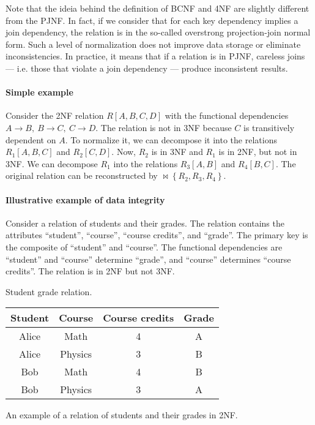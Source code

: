Note that the ideia behind the definition of BCNF and 4NF are slightly different from the
PJNF.  In fact, if we consider that for each key dependency implies a join dependency, the
relation is in the so-called overstrong projection-join normal
form.  Such a level of normalization does not improve data storage
or eliminate inconsistencies.  In practice, it means that if a relation is in PJNF,
careless joins --- i.e. those that violate a join dependency --- produce
inconsistent results.

\paragraph{Simple example}  Consider the 2NF relation $R[A, B, C, D]$ with the functional
dependencies $A \to B,~B \to C,~C \to D$.  The relation is not in 3NF because $C$ is
transitively dependent on $A$.  To normalize it, we can decompose it into the
relations $R_1[A, B, C]$ and $R_2[C, D]$.  Now, $R_2$ is in 3NF and $R_1$ is in 2NF, but
not in 3NF.  We can decompose $R_1$ into the relations $R_3[A, B]$ and $R_4[B, C]$.
The original relation can be reconstructed by $\bowtie \left\{ R_2, R_3, R_4 \right\}$.

\paragraph{Illustrative example of data integrity}  Consider a relation of students and
their grades.  The relation contains the attributes ``student'', ``course'', ``course
credits'', and ``grade''.  The primary key is the composite of ``student'' and ``course''.
The functional dependencies are ``student'' and ``course'' determine ``grade'', and
``course'' determines ``course credits''.  The relation is in 2NF but not 3NF.

\begin{tablebox}[label=tab:student-grade-illustration]{Student grade relation.}
  \centering
  \begin{tabular}{cccc}
    \toprule
    \textbf{Student} & \textbf{Course} & \textbf{Course credits} & \textbf{Grade} \\
    \midrule
    Alice & Math & 4 & A \\
    Alice & Physics & 3 & B \\
    Bob & Math & 4 & B \\
    Bob & Physics & 3 & A \\
    \bottomrule
  \end{tabular}
  \tcblower
  An example of a relation of students and their grades in 2NF.
\end{tablebox}

